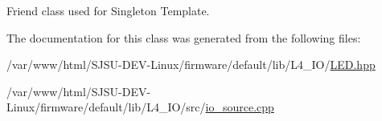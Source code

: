 Friend class used for Singleton Template. 



The documentation for this class was generated from the following files\+:\begin{DoxyCompactItemize}
\item 
/var/www/html/\+S\+J\+S\+U-\/\+D\+E\+V-\/\+Linux/firmware/default/lib/\+L4\+\_\+\+I\+O/\hyperlink{LED_8hpp}{L\+E\+D.\+hpp}\item 
/var/www/html/\+S\+J\+S\+U-\/\+D\+E\+V-\/\+Linux/firmware/default/lib/\+L4\+\_\+\+I\+O/src/\hyperlink{io__source_8cpp}{io\+\_\+source.\+cpp}\end{DoxyCompactItemize}
